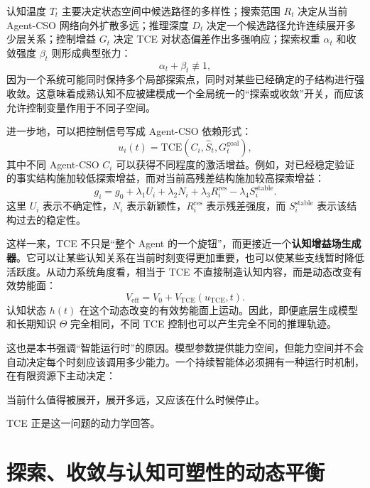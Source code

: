 认知温度 $T_t$ 主要决定状态空间中候选路径的多样性；搜索范围 $R_t$ 决定从当前 Agent-CSO 网络向外扩散多远；推理深度 $D_t$ 决定一个候选路径允许连续展开多少层关系；控制增益 $G_t$ 决定 TCE 对状态偏差作出多强响应；探索权重 $\alpha_t$ 和收敛强度 $\beta_t$ 则形成典型张力：
\begin{equation}
    \alpha_t+\beta_t
    \not\equiv 1,
\end{equation}
因为一个系统可能同时保持多个局部探索点，同时对某些已经确定的子结构进行强收敛。这意味着成熟认知不应被建模成一个全局统一的“探索或收敛”开关，而应该允许控制变量作用于不同子空间。

进一步地，可以把控制信号写成 Agent-CSO 依赖形式：
\begin{equation}
    u_i(t)
    =
    \mathrm{TCE}
    \left(
    C_i,
    \widehat S_t,
    G_t^{\mathrm{goal}}
    \right),
\end{equation}
其中不同 Agent-CSO $C_i$ 可以获得不同程度的激活增益。例如，对已经稳定验证的事实结构施加较低探索增益，而对当前高残差结构施加较高探索增益：
\begin{equation}
    g_i
    =
    g_0
    +
    \lambda_1 U_i
    +
    \lambda_2 N_i
    +
    \lambda_3 R_i^{\mathrm{res}}
    -
    \lambda_4 S_i^{\mathrm{stable}}.
\end{equation}
这里 $U_i$ 表示不确定性，$N_i$ 表示新颖性，$R_i^{\mathrm{res}}$ 表示残差强度，而 $S_i^{\mathrm{stable}}$ 表示该结构过去的稳定性。

这样一来，TCE 不只是“整个 Agent 的一个旋钮”，而更接近一个\textbf{认知增益场生成器}。它可以让某些认知关系在当前时刻变得更加重要，也可以使某些支线暂时降低活跃度。从动力系统角度看，相当于 TCE 不直接制造认知内容，而是动态改变有效势能面：
\begin{equation}
    V_{\mathrm{eff}}
    =
    V_0
    +
    V_{\mathrm{TCE}}
    (u_{\mathrm{TCE}},t).
\end{equation}
认知状态 $h(t)$ 在这个动态改变的有效势能面上运动。因此，即便底层生成模型和长期知识 $\Theta$ 完全相同，不同 TCE 控制也可以产生完全不同的推理轨迹。

这也是本书强调“智能运行时”的原因。模型参数提供能力空间，但能力空间并不会自动决定每个时刻应该调用多少能力。一个持续智能体必须拥有一种运行时机制，在有限资源下主动决定：
\begin{statementbox}
当前什么值得被展开，展开多远，又应该在什么时候停止。
\end{statementbox}
TCE 正是这一问题的动力学回答。

\section{探索、收敛与认知可塑性的动态平衡}

